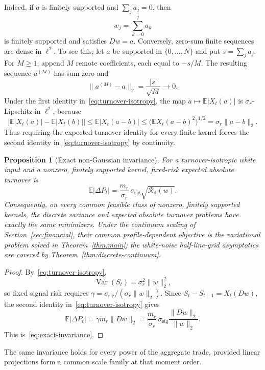 \documentclass[11pt]{amsart}
\newtheorem{proposition}[theorem]{Proposition}
\theoremstyle{definition}
\theoremstyle{remark}
\newcommand{\Rcal}{\mathcal R}
\begin{document}
Indeed, if $a$ is finitely supported and $\sum_ja_j=0$, then
\[
 w_j=\sum_{k=0}^j a_k
\]
is finitely supported and satisfies $Dw=a$. Conversely, zero-sum finite
sequences are dense in $\ell^2$. To see this, let $a$ be supported in
$\{0,\dots,N\}$ and put $s=\sum_ja_j$. For $M\geq1$, append $M$ remote
coefficients, each equal to $-s/M$. The resulting sequence $a^{(M)}$ has sum
zero and
\[
 \|a^{(M)}-a\|_2=\frac{|s|}{\sqrt M}\longrightarrow0.
\]
Under the first
identity in~\eqref{eq:turnover-isotropy}, the map
$a\mapsto\mathbb E|X_t(a)|$ is $\sigma_r$-Lipschitz in $\ell^2$, because
\[
 \bigl|\mathbb E|X_t(a)|-\mathbb E|X_t(b)|\bigr|
 \leq\mathbb E|X_t(a-b)|
 \leq\bigl(\mathbb E X_t(a-b)^2\bigr)^{1/2}
 =\sigma_r\|a-b\|_2.
\]
Thus requiring
the expected-turnover identity for every finite kernel forces the second
identity in~\eqref{eq:turnover-isotropy} by continuity.

\begin{proposition}[Exact non-Gaussian invariance]\label{prop:exact-invariance}
\leavevmode\newline
For a turnover-isotropic white input and a nonzero, finitely supported kernel,
fixed-risk expected absolute turnover is
\begin{equation}\label{eq:exact-invariance}
 \mathbb E|\Delta P_t|
 =\frac{m_r}{\sigma_r}\,\sigma_{\mathrm{sig}}
     \sqrt{\Rcal_{\mathrm d}(w)}.
\end{equation}
Consequently, on every common feasible class of nonzero, finitely supported
kernels, the discrete variance and expected absolute turnover problems have
exactly the same minimizers. Under the continuum scaling of
Section~\ref{sec:financial},
their common profile-dependent objective is the variational problem solved in
Theorem~\ref{thm:main}; the white-noise
half-line-grid asymptotics are covered by
Theorem~\ref{thm:discrete-continuum}.
\end{proposition}
\begin{proof}
By~\eqref{eq:turnover-isotropy},
\[
 \operatorname{Var}(S_t)=\sigma_r^2\|w\|_2^2,
\]
so fixed signal risk requires
$\gamma=\sigma_{\mathrm{sig}}/(\sigma_r\|w\|_2)$. Since
$S_t-S_{t-1}=X_t(Dw)$, the second identity in~\eqref{eq:turnover-isotropy}
gives
\[
 \mathbb E|\Delta P_t|
 =\gamma m_r\|Dw\|_2
 =\frac{m_r}{\sigma_r}\,\sigma_{\mathrm{sig}}
      \frac{\|Dw\|_2}{\|w\|_2}.
\]
This is~\eqref{eq:exact-invariance}.
\end{proof}

The same invariance holds for every power of the aggregate trade, provided
linear projections form a common scale family at that moment order.
\end{document}
